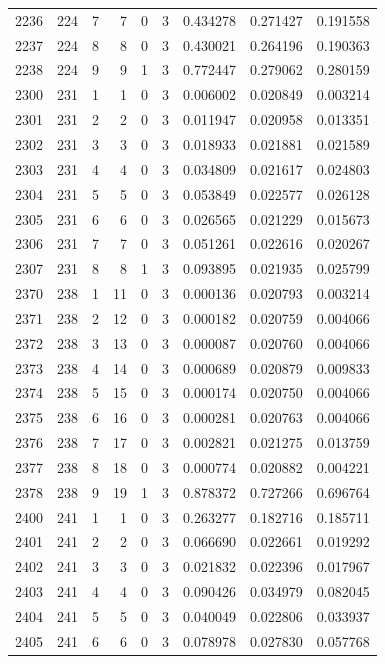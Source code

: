 \begin{longtable}{rrrrrrrrr}
2236 & 224 & 7 & 7 & 0 & 3 & 0.434278 & 0.271427 & 0.191558 \\
2237 & 224 & 8 & 8 & 0 & 3 & 0.430021 & 0.264196 & 0.190363 \\
2238 & 224 & 9 & 9 & 1 & 3 & 0.772447 & 0.279062 & 0.280159 \\
2300 & 231 & 1 & 1 & 0 & 3 & 0.006002 & 0.020849 & 0.003214 \\
2301 & 231 & 2 & 2 & 0 & 3 & 0.011947 & 0.020958 & 0.013351 \\
2302 & 231 & 3 & 3 & 0 & 3 & 0.018933 & 0.021881 & 0.021589 \\
2303 & 231 & 4 & 4 & 0 & 3 & 0.034809 & 0.021617 & 0.024803 \\
2304 & 231 & 5 & 5 & 0 & 3 & 0.053849 & 0.022577 & 0.026128 \\
2305 & 231 & 6 & 6 & 0 & 3 & 0.026565 & 0.021229 & 0.015673 \\
2306 & 231 & 7 & 7 & 0 & 3 & 0.051261 & 0.022616 & 0.020267 \\
2307 & 231 & 8 & 8 & 1 & 3 & 0.093895 & 0.021935 & 0.025799 \\
2370 & 238 & 1 & 11 & 0 & 3 & 0.000136 & 0.020793 & 0.003214 \\
2371 & 238 & 2 & 12 & 0 & 3 & 0.000182 & 0.020759 & 0.004066 \\
2372 & 238 & 3 & 13 & 0 & 3 & 0.000087 & 0.020760 & 0.004066 \\
2373 & 238 & 4 & 14 & 0 & 3 & 0.000689 & 0.020879 & 0.009833 \\
2374 & 238 & 5 & 15 & 0 & 3 & 0.000174 & 0.020750 & 0.004066 \\
2375 & 238 & 6 & 16 & 0 & 3 & 0.000281 & 0.020763 & 0.004066 \\
2376 & 238 & 7 & 17 & 0 & 3 & 0.002821 & 0.021275 & 0.013759 \\
2377 & 238 & 8 & 18 & 0 & 3 & 0.000774 & 0.020882 & 0.004221 \\
2378 & 238 & 9 & 19 & 1 & 3 & 0.878372 & 0.727266 & 0.696764 \\
2400 & 241 & 1 & 1 & 0 & 3 & 0.263277 & 0.182716 & 0.185711 \\
2401 & 241 & 2 & 2 & 0 & 3 & 0.066690 & 0.022661 & 0.019292 \\
2402 & 241 & 3 & 3 & 0 & 3 & 0.021832 & 0.022396 & 0.017967 \\
2403 & 241 & 4 & 4 & 0 & 3 & 0.090426 & 0.034979 & 0.082045 \\
2404 & 241 & 5 & 5 & 0 & 3 & 0.040049 & 0.022806 & 0.033937 \\
2405 & 241 & 6 & 6 & 0 & 3 & 0.078978 & 0.027830 & 0.057768 \\

\end{longtable}
